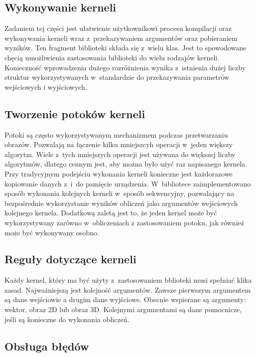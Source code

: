 \subsection{Wykonywanie kerneli}
\label{subsec:wykonywaniekerneli}
Zadaniem tej części jest ułatwienie użytkownikowi procesu kompilacji oraz wykonywania kerneli wraz z~przekazywaniem argumentów oraz pobieraniem wyników. Ten fragment biblioteki składa się z~wielu klas. Jest to spowodowane chęcią umożliwienia zastosowania biblioteki do wielu rodzajów kerneli. Konieczność wprowadzenia dużego rozróżnienia wynika z~istnienia dużej liczby struktur wykorzystywanych w~standardzie do przekazywania parametrów wejściowych i wyjściowych.



\subsection{Tworzenie potoków kerneli}
\label{subsec:potokikerneli}

Potoki są często wykorzystywanym mechanizmem podczas przetwarzaniu obrazów. Pozwalają na łączenie kilku mniejszcyh operacji w~jeden większy algorytm. Wiele z~tych mniejszych operacji jest używana do większej liczby algorytmów, dlatego cennym jest, aby można było użyć raz napisanego kernela. Przy tradycyjnym podejściu wykonania kerneli konieczne jest każdorazowe kopiowanie danych z~i~do pamięcie urządzenia. W~bibliotece zaimplementowano sposób wykonania kolejnych kerneli w~sposób sekwencyjny, pozwalający na bezpośrednie wykorzystanie wyników obliczeń jako argumentów wejściowych kolejnego kernela. Dodatkową zaletą jest to, że jeden kernel może być wykorzystywany zarówno w~obliczeniach z zastosowaniem potoku, jak również może być wykonywany osobno.



\subsection{Reguły dotyczące kerneli}
\label{subsec:regulykerneli}

Każdy kernel, który ma być użyty z~zastosowaniem bblioteki musi spełniać klika zasad. Najważniejszą jest kolejność argumentów. Zawsze pierwszym argumentem są dane wejściowie a drugim dane wyjściowe. Obecnie wspierane są argumenty: wektor, obraz 2D lub obraz 3D. Kolejnymi argumentami są dane pomocnicze, jeśli są konieczne do wykonania obliczeń.

\subsection{Obsługa błędów}
\label{subsec:obslugabledow}

